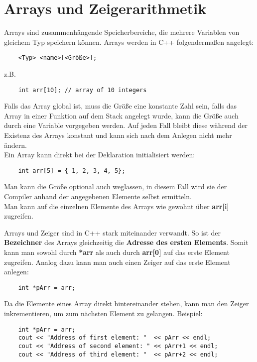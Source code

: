 \section{Arrays und Zeigerarithmetik}
Arrays sind zusammenhängende Speicherbereiche, die mehrere Variablen von gleichem Typ speichern können.
Arrays werden in C++ folgendermaßen angelegt:

\begin{lstlisting}
	<Typ> <name>[<Größe>];
\end{lstlisting}

z.B.
\begin{lstlisting}
	int arr[10]; // array of 10 integers
\end{lstlisting}

Falls das Array global ist, muss die Größe eine konstante Zahl sein, falls das Array in einer Funktion auf dem Stack angelegt wurde, kann die Größe auch durch eine Variable vorgegeben werden.
Auf jeden Fall bleibt diese während der Existenz des Arrays konstant und kann sich nach dem Anlegen nicht mehr ändern.\\
Ein Array kann direkt bei der Deklaration initialisiert werden:
\begin{lstlisting}
	int arr[5] = { 1, 2, 3, 4, 5};
\end{lstlisting}
Man kann die Größe optional auch weglassen, in diesem Fall wird sie der Compiler anhand der angegebenen Elemente selbst ermitteln. \\

Man kann auf die einzelnen Elemente des Arrays wie gewohnt über 
\textbf{arr[i]}
zugreifen.

Arrays und Zeiger sind in C++ stark miteinander verwandt.
So ist der \textbf{Bezeichner} des Arrays gleichzeitig die \textbf{Adresse des ersten Elements}.
Somit kann man sowohl durch \textbf{*arr} als auch durch \textbf{arr[0]} auf das erste Element zugreifen.
Analog dazu kann man auch einen Zeiger auf das erste Element anlegen:
\begin{lstlisting}
	int *pArr = arr;
\end{lstlisting}
Da die Elemente eines Array direkt hintereinander stehen, kann man den Zeiger inkrementieren, um zum  nächsten Element zu gelangen.
Beispiel:

\begin{lstlisting}
	int *pArr = arr;
	cout << "Address of first element: "  << pArr << endl;
	cout << "Address of second element: " << pArr+1 << endl;
	cout << "Address of third element: "  << pArr+2 << endl;
\end{lstlisting}

